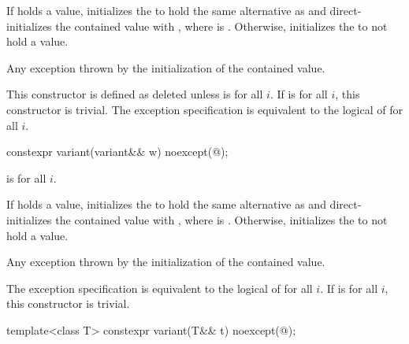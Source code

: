 \begin{itemdescr}
\pnum
\effects
If  holds a value, initializes the  to hold the same
alternative as  and direct-initializes the contained value
with , where  is .
Otherwise, initializes the  to not hold a value.

\pnum
\throws
Any exception thrown by
the initialization of the contained value.

\pnum
\remarks
This constructor is defined as deleted unless
 is  for all $i$.
If 
is  for all $i$, this constructor is trivial.
The exception specification is equivalent to the logical  of
 for all $i$.
\end{itemdescr}

%
\begin{itemdecl}
constexpr variant(variant&& w) noexcept(@\seebelow@);
\end{itemdecl}

\begin{itemdescr}
\pnum
\constraints
{} is  for all $i$.

\pnum
\effects
If  holds a value, initializes the  to hold the same
alternative as  and direct-initializes the contained value with
, where  is .
Otherwise, initializes the  to not hold a value.

\pnum
\throws
Any exception thrown by
the initialization of the contained value.

\pnum
\remarks
The exception specification is equivalent to the logical  of
 for all $i$.
If 
is  for all $i$, this constructor is trivial.
\end{itemdescr}

%
\begin{itemdecl}
template<class T> constexpr variant(T&& t) noexcept(@\seebelow@);
\end{itemdecl}

